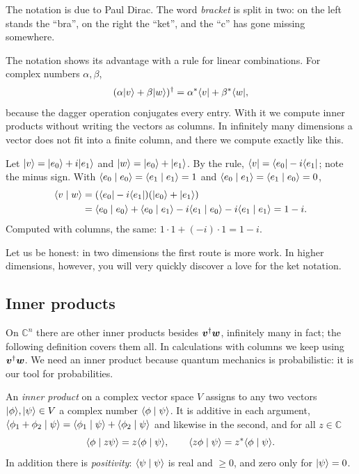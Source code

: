 \begin{historical}
	The notation is due to Paul Dirac. The word \emph{bracket} is split in two: on the left stands the ``bra'', on the right the ``ket'', and the ``c'' has gone missing somewhere.
\end{historical}

The notation shows its advantage with a rule for linear combinations. For complex numbers $\alpha,\beta$,
\begin{equation}
	(\alpha\lvert v \rangle + \beta\lvert w \rangle)^{\dagger} = \alpha^*\langle v \rvert + \beta^*\langle w \rvert,
\end{equation}
because the dagger operation conjugates every entry. With it we compute inner products without writing the vectors as columns. In infinitely many dimensions a vector does not fit into a finite column, and there we compute exactly like this.

\begin{example}
	Let $\lvert v \rangle = \lvert e_0 \rangle + i\lvert e_1 \rangle$ and $\lvert w \rangle = \lvert e_0 \rangle + \lvert e_1 \rangle$. By the rule, $\langle v \rvert = \langle e_0 \rvert - i\langle e_1 \rvert$; note the minus sign. With $\langle e_0 \mid e_0 \rangle = \langle e_1 \mid e_1 \rangle = 1$ and $\langle e_0 \mid e_1 \rangle = \langle e_1 \mid e_0 \rangle = 0$,
	\begin{equation}
		\begin{split}
			\langle v \mid w \rangle &= (\langle e_0 \rvert - i\langle e_1 \rvert)(\lvert e_0 \rangle + \lvert e_1 \rangle) \\
			&= \langle e_0 \mid e_0 \rangle + \langle e_0 \mid e_1 \rangle - i\langle e_1 \mid e_0 \rangle - i\langle e_1 \mid e_1 \rangle = 1 - i.
		\end{split}
	\end{equation}
	Computed with columns, the same: $1\cdot 1 + (-i)\cdot 1 = 1 - i$.
\end{example}

Let us be honest: in two dimensions the first route is more work. In higher dimensions, however, you will very quickly discover a love for the ket notation.

\subsection{Inner products}
On $\mathbb{C}^n$ there are other inner products besides $\boldsymbol{v}^{\dagger}\boldsymbol{w}$, infinitely many in fact; the following definition covers them all. In calculations with columns we keep using $\boldsymbol{v}^{\dagger}\boldsymbol{w}$. We need an inner product because quantum mechanics is probabilistic: it is our tool for probabilities.

\begin{definition}
	An \emph{inner product} on a complex vector space $V$ assigns to any two vectors $\lvert \phi \rangle,\lvert \psi \rangle\in V$ a complex number $\langle \phi \mid \psi \rangle$. It is additive in each argument, $\langle \phi_1 + \phi_2 \mid \psi \rangle = \langle \phi_1 \mid \psi \rangle + \langle \phi_2 \mid \psi \rangle$ and likewise in the second, and for all $z\in\mathbb{C}$
	\begin{equation}
		\langle \phi \mid z\psi \rangle = z\langle \phi \mid \psi \rangle, \qquad \langle z\phi \mid \psi \rangle = z^*\langle \phi \mid \psi \rangle.
	\end{equation}
	In addition there is \emph{positivity}: $\langle \psi \mid \psi \rangle$ is real and $\geq 0$, and zero only for $\lvert \psi \rangle = 0$.
\end{definition}

